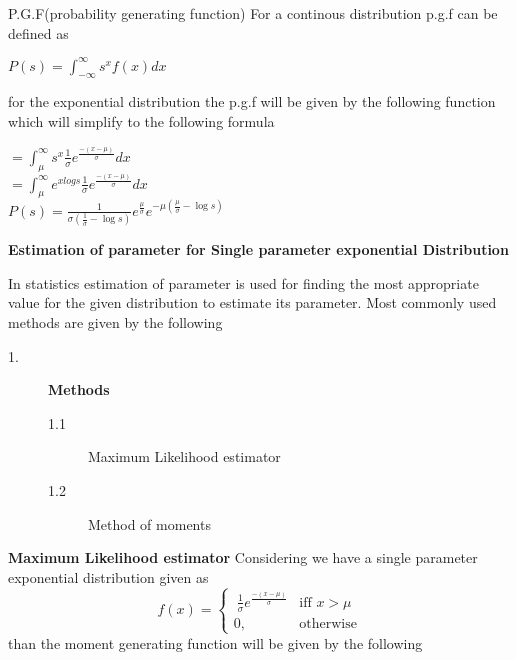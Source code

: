 \documentclass[12pt]{article}
\begin{document}
 P.G.F(probability generating function) For a continous distribution p.g.f can be defined as
 \begin{center}
 $P(s)=\int_{-\infty}^{\infty} s^x f(x) dx$
 \end{center}
 for the exponential distribution the p.g.f will be given by the following function which will simplify to the following formula
 \begin{center}
 $=\int_{\mu}^{\infty} s^{x} \frac{1}{\sigma} e^{\frac{-(x-\mu)}{\sigma}} dx$\\
 $=\int_{\mu}^{\infty} e^{x logs} \frac{1}{\sigma}e^{\frac{-(x-\mu)}{\sigma}} dx$\\
 	$P(s)=\frac{1}{\sigma (\frac{1}{\sigma}-\log{s})} e^{\frac{\mu}{\sigma}} e^{-\mu(\frac{\mu}{\sigma}-\log{s})} $\\
 
 \end{center}
 \begin{flushleft}
 \textbf{Estimation of parameter for Single parameter exponential Distribution}
\end{flushleft}
 In statistics estimation of parameter is used for finding the most appropriate value for the given distribution to estimate its parameter. Most commonly used methods are given by the following\\
 \begin{description}
 \item[1.] \textbf{Methods}
 \begin{description}
 	\item[1.1] Maximum Likelihood estimator
 	\item[1.2] Method of moments
 \end{description}
 \end{description}
 \textbf{Maximum Likelihood estimator}
 Considering we have a single  parameter exponential distribution given as
   \[
   f(x)= 
   \begin{cases}
   \   \frac{1}{\sigma} e^{\frac{-(x-\mu)}{\sigma}}      & \text{iff } x>\mu\\
   0,         & \text{otherwise} 
   \end{cases}
   \] 
  than the moment generating function will be given by the following
\end{document}
